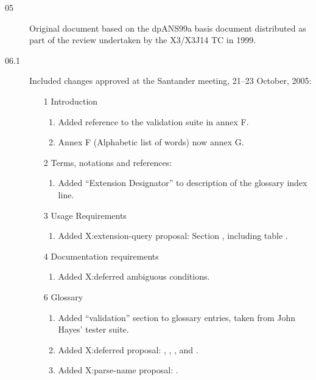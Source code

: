 \label{annex:changelog}

\begin{description}
\item[05]
	Original document based on the dpANS99a basis document distributed
	as part of the review undertaken by the X3/X3J14 TC in 1999.


\item[06.1]
	Included changes approved at the Santander meeting, 21--23 October,
	2005:
	\begin{enumerate}
	\item[1] Introduction
		\begin{enumerate}
		\item Added reference to the validation suite in annex F.
		\item Annex F (Alphabetic list of words) now annex G.
		\end{enumerate}

	\item[2] Terms, notations and references:
		\begin{enumerate}
		\item Added ``Extension Designator'' to description of the
			glossary index line.
		\end{enumerate}

	\item[3] Usage Requirements
		\begin{enumerate}
		\item Added \textsf{X:extension-query} proposal:
			Section , including table
			.
		\end{enumerate}

	\item[4] Documentation requirements
		\begin{enumerate}
		\item Added \textsf{X:deferred} ambiguous conditions.
		\end{enumerate}

	\item[6] Glossary
		\begin{enumerate}
		\item Added ``validation'' section to glossary entries, taken
			from John Hayes' tester suite.
		\item Added \textsf{X:deferred} proposal:
			,
			,
			,
			 and
			.
		\item Added \textsf{X:parse-name} proposal:
			.
		\end{enumerate}


\end{enumerate}
\end{description}

